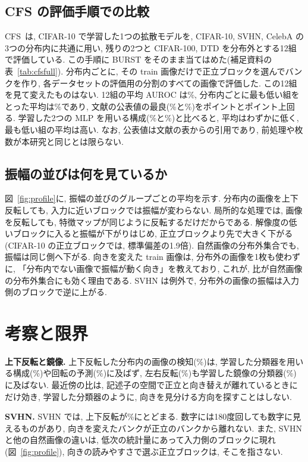 \documentclass[MIRU,submit]{miru2025j}
\newcommand{\method}{BURST}               %
\begin{document}
\subsection{CFS の評価手順での比較}
\label{sec:cfs}
CFS~\cite{rouzoumka2026cfs}は, CIFAR-10 で学習した1つの拡散モデルを, CIFAR-10, SVHN, CelebA の3つの分布内に共通に用い, 残りの2つと CIFAR-100, DTD を分布外とする12組で評価している. この手順に \method{} をそのまま当てはめた(補足資料の表~\ref{tab:cfsfull}). 分布内ごとに, その train 画像だけで正立ブロックを選んでバンクを作り, 各データセットの評価用の分割のすべての画像で評価した. この12組を見て変えたものはない. 12組の平均 AUROC は\nCfsAvg\%, 分布内ごとに最も低い組をとった平均は\nCfsWorst\%であり, 文献の公表値の最良(\nCfsBestAvg\%と\nCfsBestWorst\%)を\nCfsGap{}ポイントと\nCfsGapWorst{}ポイント上回る. 学習した2つの MLP を用いる構成(\nCfsTrainedAvg\%と\nCfsTrainedWorst\%)と比べると, 平均はわずかに低く, 最も低い組の平均は高い. なお, 公表値は文献の表からの引用であり, 前処理や枚数が本研究と同じとは限らない.

\subsection{振幅の並びは何を見ているか}
\label{sec:what}
図~\ref{fig:profile}に, 振幅の並びのグループごとの平均を示す. 分布内の画像を上下反転しても, 入力に近いブロックでは振幅が変わらない. 局所的な処理では, 画像を反転しても, 特徴マップが同じように反転するだけだからである. 解像度の低いブロックに入ると振幅が下がりはじめ, 正立ブロックより先で大きく下がる(CIFAR-10 の正立ブロックでは, 標準偏差の1.9倍). 自然画像の分布外集合でも, 振幅は同じ側へ下がる. 向きを変えた train 画像は, 分布外の画像を1枚も使わずに, 「分布内でない画像で振幅が動く向き」を教えており, これが, 比が自然画像の分布外集合にも効く理由である. SVHN は例外で, 分布外の画像の振幅は入力側のブロックで逆に上がる.

\section{考察と限界}
\label{sec:limits}
\textbf{上下反転と鏡像.} 上下反転した分布内の画像の検知(\nUdT\%)は, 学習した分類器を用いる構成(\nTrainedUdT\%)や回転の予測(\nRotUdT\%)に及ばず, 左右反転(\nHfT\%)も学習した鏡像の分類器(\nTrainedHfT\%)に及ばない. 最近傍の比は, 記述子の空間で正立と向き替えが離れているときにだけ効き, 学習した分類器のように, 向きを見分ける方向を探すことはしない.

\textbf{SVHN.} SVHN では, 上下反転が\nUdSvhnT\%にとどまる. 数字には180度回しても数字に見えるものがあり, 向きを変えたバンクが正立のバンクから離れない. また, SVHN と他の自然画像の違いは, 低次の統計量にあって入力側のブロックに現れ(図~\ref{fig:profile}), 向きの読みやすさで選ぶ正立ブロックは, そこを指さない.
\end{document}
